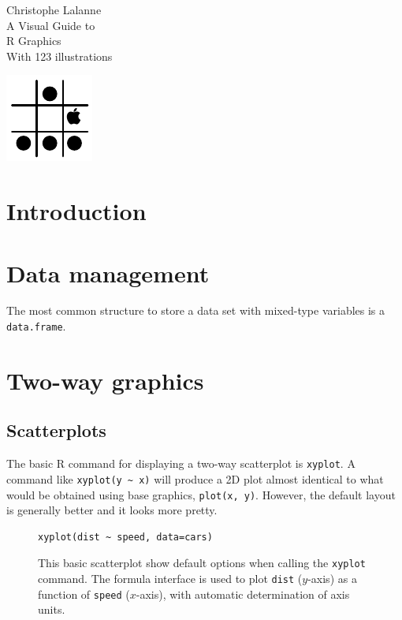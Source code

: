 \documentclass[a4paper,twoside]{book}
\renewcommand{\texttt}[1]{\lstinline{#1}}
\newcommand{\R}{\textsf{R}\xspace}
\newlength{\tpheight}\setlength{\tpheight}{0.9\textheight}
\newlength{\txtheight}\setlength{\txtheight}{0.9\tpheight}
\begin{document}
\thispagestyle{empty}
\begingroup%
\raggedleft
\vspace*{\baselineskip}
{\Large Christophe Lalanne}\\[0.167\txtheight]
{\Large\titlefont A Visual Guide to}\\[\baselineskip]
{\textcolor{Medium}{\Huge\titlefont R Graphics}}\\[\baselineskip]
{\tiny\titlefont With 123 illustrations}\par
\vfill
{\includegraphics[scale=.5]{logo}}\par
\vspace*{3\baselineskip}
\endgroup

\frontmatter
\tableofcontents
\mainmatter
\chapter{Introduction}

\chapter{Data management}

The most common structure to store a data set with mixed-type
variables is a \texttt{data.frame}.

\lipsum

\chapter{Two-way graphics}




\section{Scatterplots}
The basic \R command for displaying a two-way scatterplot is
\texttt{xyplot}. A command like \texttt{xyplot(y ~ x)} will produce a
2D plot almost identical to what would be obtained using base
graphics, \texttt{plot(x, y)}. However, the default layout is
generally better and it looks more pretty.

\begin{figure}[H]
\begin{lstlisting}
xyplot(dist ~ speed, data=cars)
\end{lstlisting}
\fcapside[\FBwidth]
{\texttt{[image: fig\_001-crop]}}
{\caption*{This basic scatterplot show default options when calling the
\texttt{xyplot} command. The formula interface is used to plot
\texttt{dist} ($y$-axis) as a function of \texttt{speed} ($x$-axis),
with automatic determination of axis units.}}
\end{figure}
\end{document}
